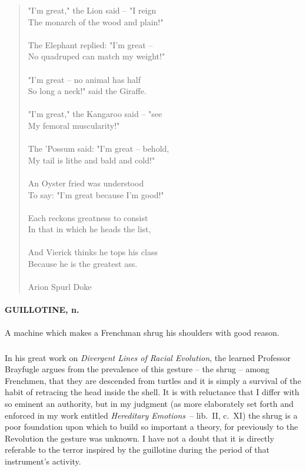 \documentclass[11pt]{article}
\begin{document}
\begin{quote}   "I'm great," the Lion said -- "I reign \\
  The monarch of the wood and plain!" \\
 \\
  The Elephant replied:  "I'm great -- \\
  No quadruped can match my weight!" \\
 \\
  "I'm great -- no animal has half \\
  So long a neck!" said the Giraffe. \\
 \\
  "I'm great," the Kangaroo said -- "see \\
  My femoral muscularity!" \\
 \\
  The 'Possum said:  "I'm great -- behold, \\
  My tail is lithe and bald and cold!" \\
 \\
  An Oyster fried was understood \\
  To say:  "I'm great because I'm good!" \\
 \\
  Each reckons greatness to consist \\
  In that in which he heads the list, \\
 \\
  And Vierick thinks he tops his class \\
  Because he is the greatest ass. \\
 \\
Arion Spurl Doke \end{quote}


\paragraph{GUILLOTINE, n.}  A machine which makes a Frenchman shrug his shoulders
with good reason.
\subparagraph{}   In his great work on {\em Divergent Lines of Racial Evolution}, the
learned Professor Brayfugle argues from the prevalence of this gesture
-- the shrug -- among Frenchmen, that they are descended from turtles
and it is simply a survival of the habit of retracing the head inside
the shell.  It is with reluctance that I differ with so eminent an
authority, but in my judgment (as more elaborately set forth and
enforced in my work entitled {\em Hereditary Emotions}~-- lib.~II, c.~XI)
the shrug is a poor foundation upon which to build so important a
theory, for previously to the Revolution the gesture was unknown.  I
have not a doubt that it is directly referable to the terror inspired
by the guillotine during the period of that instrument's activity.
\end{document}
